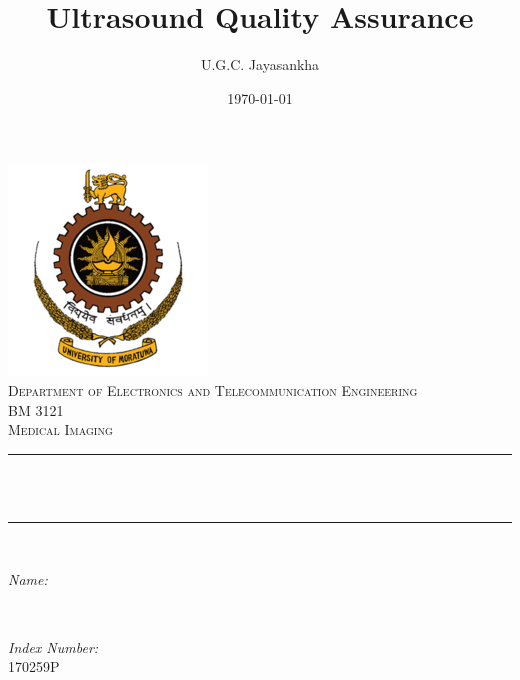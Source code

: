 \documentclass[12pt]{article}
\title{Ultrasound Quality Assurance}					%
\author{U.G.C. Jayasankha}								%
\date{\today}											%
\makeatletter
\let\thetitle\@title
\let\theauthor\@author
\let\thedate\@date
\makeatother
\begin{document}

\begin{titlepage}
	\centering
    \vspace*{0.5 cm}
    \includegraphics[scale = 0.8]{University_of_Moratuwa_logo.png}\\[1.0 cm]	%
    \textsc{\Large Department of Electronics and Telecommunication Engineering}\\[0.8 cm]
	\textsc{\large BM 3121}\\[0.5 cm]				%
	\textsc{\Large Medical Imaging}\\[0.5 cm]				%
	\rule{\linewidth}{0.2 mm} \\[0.4 cm]
	{ \huge \bfseries \thetitle}\\
	\rule{\linewidth}{0.2 mm} \\[1.5 cm]
	
	\begin{minipage}{0.4\textwidth}
		\begin{flushleft} \large
			\emph{Name:}\\
			\theauthor
			\end{flushleft}
			\end{minipage}~
			\begin{minipage}{0.4\textwidth}
			\begin{flushright} \large
			\emph{Index Number:} \\
			170259P									%
		\end{flushright}
	\end{minipage}\\[2 cm]
	
	{\large \thedate}\\[2 cm]
 
	\vfill
	
\end{titlepage}
\end{document}
